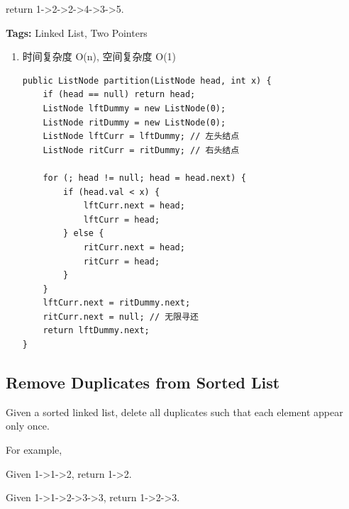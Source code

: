 \documentclass[12pt]{book}
\begin{document}
return 1->2->2->4->3->5.

\textbf{Tags:} Linked List, Two Pointers

\begin{enumerate}
\item 时间复杂度 O(n), 空间复杂度 O(1)
\label{sec-3-2-3-1}

\lstset{language=java,label= ,caption= ,numbers=none}
\begin{lstlisting}
public ListNode partition(ListNode head, int x) {
    if (head == null) return head;
    ListNode lftDummy = new ListNode(0);
    ListNode ritDummy = new ListNode(0);
    ListNode lftCurr = lftDummy; // 左头结点
    ListNode ritCurr = ritDummy; // 右头结点

    for (; head != null; head = head.next) {
        if (head.val < x) {
            lftCurr.next = head;
            lftCurr = head;
        } else {
            ritCurr.next = head;
            ritCurr = head;
        }
    }
    lftCurr.next = ritDummy.next;
    ritCurr.next = null; // 无限寻还
    return lftDummy.next;
}
\end{lstlisting}
\end{enumerate}

\subsection{Remove Duplicates from Sorted List}
\label{sec-3-2-4}
Given a sorted linked list, delete all duplicates such that each element appear only once.

For example,

Given 1->1->2, return 1->2.

Given 1->1->2->3->3, return 1->2->3.
\end{document}
